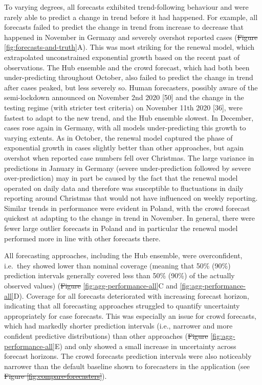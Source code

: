 \documentclass[10pt,letterpaper]{article}
\providecommand{\DIFaddtex}[1]{{\protect\color{blue}\uwave{#1}}} %
\providecommand{\DIFdeltex}[1]{{\protect\color{red}\sout{#1}}}                      %
\providecommand{\DIFaddbegin}{} %
\providecommand{\DIFaddend}{} %
\providecommand{\DIFdelbegin}{} %
\providecommand{\DIFdelend}{} %
\providecommand{\DIFadd}[1]{\texorpdfstring{\DIFaddtex{#1}}{#1}} %
\providecommand{\DIFdel}[1]{\texorpdfstring{\DIFdeltex{#1}}{}} %
\newcommand{\DIFscaledelfig}{0.5}
\newlength{\DIFdelgraphicswidth} %
\newlength{\DIFdelgraphicsheight} %
\newcommand{\DIFaddincludegraphics}[2][]{{\color{blue}\fbox{\DIFOincludegraphics[#1]{#2}}}} %
\newcommand{\DIFdelincludegraphics}[2][]{%
\sbox{\DIFdelgraphicsbox}{\DIFOincludegraphics[#1]{#2}}%
\settoboxwidth{\DIFdelgraphicswidth}{\DIFdelgraphicsbox} %
\settoboxtotalheight{\DIFdelgraphicsheight}{\DIFdelgraphicsbox} %
\scalebox{\DIFscaledelfig}{%
\parbox[b]{\DIFdelgraphicswidth}{\usebox{\DIFdelgraphicsbox}\\[-\baselineskip] \rule{\DIFdelgraphicswidth}{0em}}\llap{\resizebox{\DIFdelgraphicswidth}{\DIFdelgraphicsheight}{%
\setlength{\unitlength}{\DIFdelgraphicswidth}%
\begin{picture}(1,1)%
\thicklines\linethickness{2pt} %
{\color[rgb]{1,0,0}\put(0,0){\framebox(1,1){}}}%
{\color[rgb]{1,0,0}\put(0,0){\line( 1,1){1}}}%
{\color[rgb]{1,0,0}\put(0,1){\line(1,-1){1}}}%
\end{picture}%
}\hspace*{3pt}}} %
} %
\DeclareRobustCommand{\DIFaddbegin}{\DIFOaddbegin \let\includegraphics\DIFaddincludegraphics} %
\DeclareRobustCommand{\DIFaddend}{\DIFOaddend \let\includegraphics\DIFOincludegraphics} %
\DeclareRobustCommand{\DIFdelbegin}{\DIFOdelbegin \let\includegraphics\DIFdelincludegraphics} %
\DeclareRobustCommand{\DIFdelend}{\DIFOaddend \let\includegraphics\DIFOincludegraphics} %
\begin{document}
To varying degrees, all forecasts exhibited trend-following behaviour
and were rarely able to predict a change in trend before it had
happened. For example, all forecasts failed to predict the change in
trend from increase to decrease that happened in November in Germany and
severely overshot reported cases (\DIFdelbegin \DIFdel{Figure
}\DIFdelend \DIFaddbegin \DIFadd{Fig }\DIFaddend \ref{fig:forecasts-and-truth}A).
This was most striking for the renewal model, which extrapolated
unconstrained exponential growth based on the recent past of
observations. The Hub ensemble and the crowd forecast, which had both
been under-predicting throughout October, also failed to predict the
change in trend after cases peaked, but less severely so. Human
forecasters, possibly aware of the semi-lockdown announced on November
2nd 2020 {[}50{]} and the change in the testing regime (with stricter
test criteria) on November 11th 2020 {[}36{]}, were fastest to adapt to
the new trend, and the Hub ensemble slowest. In December, cases rose
again in Germany, with all models under-predicting this growth to
varying extents. As in October, the renewal model captured the phase of
exponential growth in cases slightly better than other approaches, but
again overshot when reported case numbers fell over Christmas. The large
variance in predictions in January in Germany (severe under-prediction
followed by severe over-prediction) may in part be caused by the fact
that the renewal model operated on daily data and therefore was
susceptible to fluctuations in daily reporting around Christmas that
would not have influenced on weekly reporting. Similar trends in
performance were evident in Poland, with the crowd forecast quickest at
adapting to the change in trend in November. In general, there were
fewer large outlier forecasts in Poland and in particular the renewal
model performed more in line with other forecasts there.

All forecasting approaches, including the Hub ensemble, were
overconfident, i.e.~they showed lower than nominal coverage (meaning
that 50\% (90\%) prediction intervals generally covered less than 50\%
(90\%) of the actually observed values) (\DIFdelbegin \DIFdel{Figure
}\DIFdelend \DIFaddbegin \DIFadd{Figs
}\DIFaddend \ref{fig:agg-performance-all}C and \ref{fig:agg-performance-all}D).
Coverage for all forecasts deteriorated with increasing forecast
horizon, indicating that all forecasting approaches struggled to
quantify uncertainty appropriately for case forecasts. This was
especially an issue for crowd forecasts, which had markedly shorter
prediction intervals (i.e., narrower and more confident predictive
distributions) than other approaches (\DIFdelbegin \DIFdel{Figure
}\DIFdelend \DIFaddbegin \DIFadd{Fig
}\DIFaddend \ref{fig:agg-performance-all}E) and only showed a small increase in
uncertainty across forecast horizons. The crowd forecasts prediction
intervals were also noticeably narrower than the default baseline shown
to forecasters in the application (see
\DIFdelbegin \DIFdel{Figure
\ref{fig:compare-forecasters}}\DIFdelend \DIFaddbegin {}\DIFaddend ).
\end{document}
